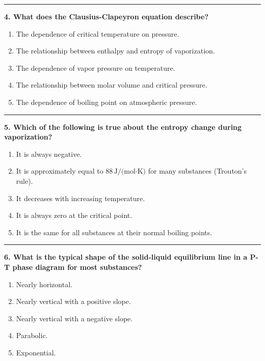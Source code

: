 \documentclass[
  9pt,
]{extbook}
\providecommand{\tightlist}{%
  \setlength{\itemsep}{0pt}\setlength{\parskip}{0pt}}
\theoremstyle{definition}
\theoremstyle{definition}
\theoremstyle{definition}
\theoremstyle{definition}
\theoremstyle{remark}
\begin{document}
\begin{center}\rule{0.5\linewidth}{0.5pt}\end{center}

\textbf{4. What does the Clausius-Clapeyron equation describe?}

\begin{enumerate}
\def\labelenumi{\alph{enumi}.}
\tightlist
\item
  The dependence of critical temperature on pressure.
\item
  The relationship between enthalpy and entropy of vaporization.
\item
  The dependence of vapor pressure on temperature.
\item
  The relationship between molar volume and critical pressure.
\item
  The dependence of boiling point on atmospheric pressure.
\end{enumerate}

\begin{center}\rule{0.5\linewidth}{0.5pt}\end{center}

\textbf{5. Which of the following is true about the entropy change during vaporization?}

\begin{enumerate}
\def\labelenumi{\alph{enumi}.}
\tightlist
\item
  It is always negative.
\item
  It is approximately equal to \(88\,\text{J/(mol·K)}\) for many substances (Trouton's rule).
\item
  It decreases with increasing temperature.
\item
  It is always zero at the critical point.
\item
  It is the same for all substances at their normal boiling points.
\end{enumerate}

\begin{center}\rule{0.5\linewidth}{0.5pt}\end{center}

\textbf{6. What is the typical shape of the solid-liquid equilibrium line in a P-T phase diagram for most substances?}

\begin{enumerate}
\def\labelenumi{\alph{enumi}.}
\tightlist
\item
  Nearly horizontal.
\item
  Nearly vertical with a positive slope.
\item
  Nearly vertical with a negative slope.
\item
  Parabolic.
\item
  Exponential.
\end{enumerate}
\end{document}
